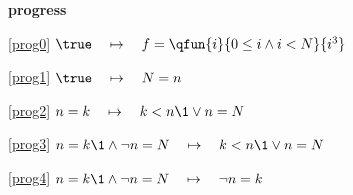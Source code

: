 \textbf{progress}
\begin{block}
\item[ \eqref{prog0} ]{$\true \quad \mapsto\quad f = \qfun{i}{0 \le i \land i < N}{i^3} $} %
\item[ \eqref{prog1} ]{$\true \quad \mapsto\quad N = n $} %
\item[ \eqref{prog2} ]{$n = k \quad \mapsto\quad k < n \1\lor n = N $} %
\item[ \eqref{prog3} ]{$n = k \1\land \neg n = N  \quad \mapsto\quad k < n \1\lor n = N $} %
\item[ \eqref{prog4} ]{$n = k \1\land \neg n = N  \quad \mapsto\quad \neg n = k $} %
\end{block}

